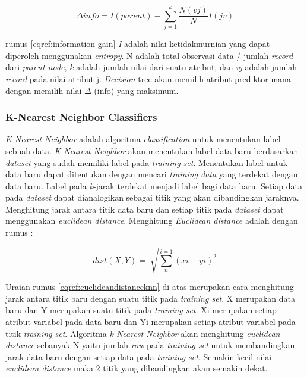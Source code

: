 \begin{equation}
  \Delta info = I(parent) - \sum_{j=1}^{k} \frac{N(vj)}{N}I(jv)
  \label{eqref:information gain}
\end{equation}

rumus \eqref{eqref:information gain} \textit{I} adalah nilai ketidakmurnian yang dapat diperoleh menggunakan \textit{entropy}. N adalah total observasi data / jumlah \textit{record} dari \textit{parent node}, \textit{k} adalah jumlah nilai dari suatu atribut, dan \textit{vj} adalah jumlah \textit{record} pada nilai atribut j. \textit{Decision} tree akan memilih atribut prediktor mana dengan memilih nilai $\Delta$ (info) yang maksimum.

\subsubsection{K-Nearest Neighbor Classifiers}
 \textit{K-Nearest Neighbor} adalah algoritma \textit{classification} untuk menentukan label sebuah data. \textit{K-Nearest Neighbor} akan menentukan label data baru berdasarkan \textit{dataset} yang sudah memiliki label pada \textit{training set}. Menentukan label untuk data baru dapat ditentukan dengan mencari  \textit{training data} yang terdekat dengan data baru. Label pada \textit{k}-jarak terdekat menjadi label bagi data baru. Setiap data pada \textit{dataset} dapat dianalogikan sebagai titik yang akan dibandingkan jaraknya. Menghitung jarak antara titik data baru dan setiap titik pada \textit{dataset} dapat menggunakan \textit{euclidean distance}. Menghitung \textit{Euclidean distance} adalah dengan rumus : 

\begin{equation}
	dist(X,Y) = \sqrt[]{\sum_{n}^{i=1}(xi-yi)^2}
	\label{eqref:euclideandistanceknn}
\end{equation}

Uraian rumus \eqref{eqref:euclideandistanceknn} di atas merupakan cara menghitung jarak antara titik baru dengan suatu titik pada \textit{training set}. X merupakan data baru dan Y merupakan suatu titik pada \textit{training set}. Xi merupakan setiap atribut variabel pada data baru dan Yi merupakan setiap atribut variabel pada titik \textit{training set}. Algoritma \textit{k-Nearest Neighbor} akan menghitung \textit{euclidean distance} sebanyak N yaitu jumlah \textit{row} pada \textit{training set} untuk membandingkan jarak data baru dengan setiap data pada \textit{training set}. Semakin kecil nilai \textit{euclidean distance} maka 2 titik yang dibandingkan akan semakin dekat. \\

